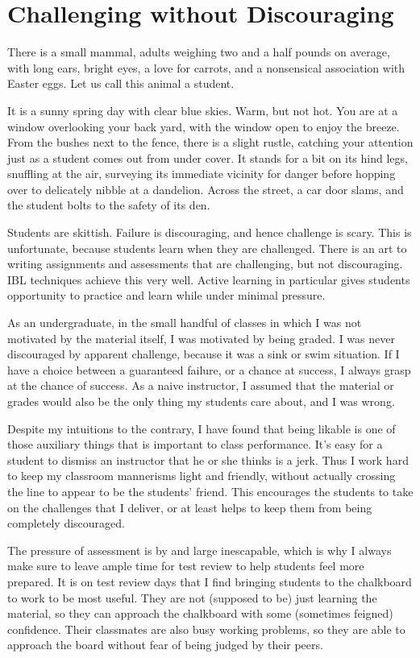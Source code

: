 \documentclass[11pt]{article}
\begin{document}
\section{Challenging without Discouraging}

There is a small mammal, adults weighing two and a half pounds on average, with
long ears, bright eyes, a love for carrots, and a nonsensical association with
Easter eggs. Let us call this animal a student.

It is a sunny spring day with clear blue skies. Warm, but not hot. You are at a
window overlooking your back yard, with the window open to enjoy the
breeze. From the bushes next to the fence, there is a slight rustle, catching
your attention just as a student comes out from under cover. It stands for a bit
on its hind legs, snuffling at the air, surveying its immediate vicinity for
danger before hopping over to delicately nibble at a dandelion. Across the
street, a car door slams, and the student bolts to the safety of its den.

Students are skittish. Failure is discouraging, and hence challenge is
scary. This is unfortunate, because students learn when they are
challenged. There is an art to writing assignments and assessments that are
challenging, but not discouraging. IBL techniques achieve this very well. Active
learning in particular gives students opportunity to practice and learn while
under minimal pressure.

As an undergraduate, in the small handful of classes in which I was not
motivated by the material itself, I was motivated by being graded. I was never
discouraged by apparent challenge, because it was a sink or swim situation. If I
have a choice between a guaranteed failure, or a chance at success, I always
grasp at the chance of success. As a naive instructor, I assumed that the
material or grades would also be the only thing my students care about, and I
was wrong.

Despite my intuitions to the contrary, I have found that being likable is one of
those auxiliary things that is important to class performance. It's easy for a
student to dismiss an instructor that he or she thinks is a jerk. Thus I work
hard to keep my classroom mannerisms light and friendly, without actually
crossing the line to appear to be the students' friend. This encourages the
students to take on the challenges that I deliver, or at least helps to keep
them from being completely discouraged.

The pressure of assessment is by and large inescapable, which is why I always
make sure to leave ample time for test review to help students feel more
prepared. It is on test review days that I find bringing students to the
chalkboard to work to be most useful. They are not (supposed to be) just
learning the material, so they can approach the chalkboard with some (sometimes
feigned) confidence. Their classmates are also busy working problems, so they
are able to approach the board without fear of being judged by their
peers.
\end{document}
